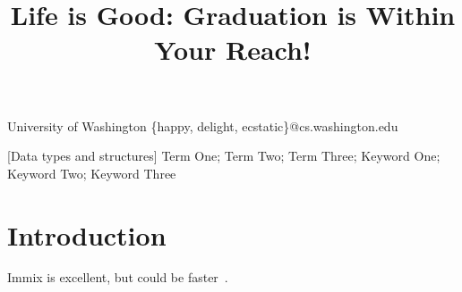 \documentclass[10pt,natbib,preprint]{sigplanconf}
\begin{document}


\title{Life is Good: Graduation is Within Your Reach!}

           {University of Washington}
           {\{happy, delight, ecstatic\}@cs.washington.edu}

\maketitle



{\footnotesize
{}[Data
    types and structures]
\terms  %
Term One; Term Two; Term Three;
\keywords
Keyword One; Keyword Two; Keyword Three
}


\section{Introduction}

Immix is excellent, but could be faster~\citep{immix}.



\end{document}

